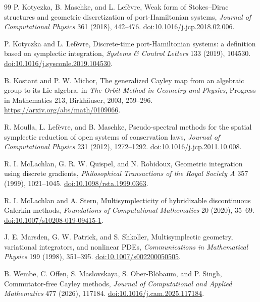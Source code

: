 \documentclass[11pt,a4paper]{article}
\begin{document}
\begin{thebibliography}{99}
P. Kotyczka, B. Maschke, and L. Lef\`evre,
\newblock Weak form of Stokes--Dirac structures and geometric
discretization of port-Hamiltonian systems,
\newblock \emph{Journal of Computational Physics} 361 (2018), 442--476.
\newblock \href{https://doi.org/10.1016/j.jcp.2018.02.006}
{doi:10.1016/j.jcp.2018.02.006}.

P. Kotyczka and L. Lef\`evre,
\newblock Discrete-time port-Hamiltonian systems: a definition based on
symplectic integration,
\newblock \emph{Systems \& Control Letters} 133 (2019), 104530.
\newblock \href{https://doi.org/10.1016/j.sysconle.2019.104530}
{doi:10.1016/j.sysconle.2019.104530}.

B. Kostant and P. W. Michor,
\newblock The generalized Cayley map from an algebraic group to its Lie
algebra,
\newblock in \emph{The Orbit Method in Geometry and Physics}, Progress in
Mathematics 213, Birkh\"auser, 2003, 259--296.
\newblock \url{https://arxiv.org/abs/math/0109066}.

R. Moulla, L. Lef\`evre, and B. Maschke,
\newblock Pseudo-spectral methods for the spatial symplectic reduction of
open systems of conservation laws,
\newblock \emph{Journal of Computational Physics} 231 (2012), 1272--1292.
\newblock \href{https://doi.org/10.1016/j.jcp.2011.10.008}
{doi:10.1016/j.jcp.2011.10.008}.

R. I. McLachlan, G. R. W. Quispel, and N. Robidoux,
\newblock Geometric integration using discrete gradients,
\newblock \emph{Philosophical Transactions of the Royal Society A}
357 (1999), 1021--1045.
\newblock \href{https://doi.org/10.1098/rsta.1999.0363}
{doi:10.1098/rsta.1999.0363}.

R. I. McLachlan and A. Stern,
\newblock Multisymplecticity of hybridizable discontinuous Galerkin
methods,
\newblock \emph{Foundations of Computational Mathematics} 20 (2020),
35--69.
\newblock \href{https://doi.org/10.1007/s10208-019-09415-1}
{doi:10.1007/s10208-019-09415-1}.

J. E. Marsden, G. W. Patrick, and S. Shkoller,
\newblock Multisymplectic geometry, variational integrators, and nonlinear
PDEs,
\newblock \emph{Communications in Mathematical Physics} 199 (1998),
351--395.
\newblock \href{https://doi.org/10.1007/s002200050505}
{doi:10.1007/s002200050505}.

B. Wembe, C. Offen, S. Maslovskaya, S. Ober-Bl\"obaum, and P. Singh,
\newblock Commutator-free Cayley methods,
\newblock \emph{Journal of Computational and Applied Mathematics} 477
(2026), 117184.
\newblock \href{https://doi.org/10.1016/j.cam.2025.117184}
{doi:10.1016/j.cam.2025.117184}.


\end{thebibliography}
\end{document}
